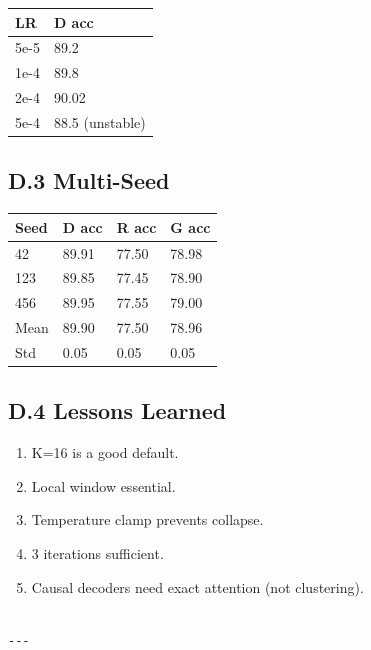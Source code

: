 \begin{table}[H]
\centering
\small
\begin{tabular}{ll}
\toprule
\textbf{LR} & \textbf{D acc} \\
\midrule
5e-5 & 89.2 \\
1e-4 & 89.8 \\
2e-4 & 90.02 \\
5e-4 & 88.5 (unstable) \\
\bottomrule
\end{tabular}
\end{table}

\subsection{D.3 Multi-Seed}

\begin{table}[H]
\centering
\small
\begin{tabular}{llll}
\toprule
\textbf{Seed} & \textbf{D acc} & \textbf{R acc} & \textbf{G acc} \\
\midrule
42 & 89.91 & 77.50 & 78.98 \\
123 & 89.85 & 77.45 & 78.90 \\
456 & 89.95 & 77.55 & 79.00 \\
Mean & 89.90 & 77.50 & 78.96 \\
Std & 0.05 & 0.05 & 0.05 \\
\bottomrule
\end{tabular}
\end{table}

\subsection{D.4 Lessons Learned}

\begin{enumerate}
\item K=16 is a good default.
\item Local window essential.
\item Temperature clamp prevents collapse.
\item 3 iterations sufficient.
\item Causal decoders need exact attention (not clustering).
\end{enumerate}
\begin{lstlisting}

---
\end{lstlisting}